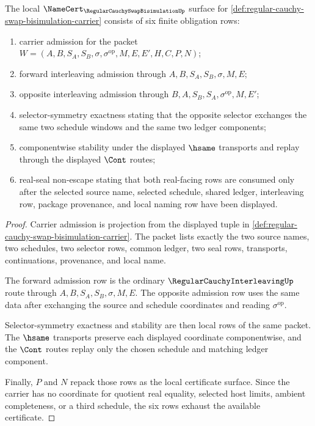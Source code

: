\begin{theorem}
\label{thm:regular-cauchy-swap-bisimulation-namecert-obligations}
The local $\NameCert_{\RegularCauchySwapBisimulationUp}$ surface for \autoref{def:regular-cauchy-swap-bisimulation-carrier} consists of six finite obligation rows:
\begin{enumerate}
\item carrier admission for the packet $W=(A,B,S_A,S_B,\sigma,\sigma^{\mathrm{op}},M,E,E',H,C,P,N)$;
\item forward interleaving admission through $A,B,S_A,S_B,\sigma,M,E$;
\item opposite interleaving admission through $B,A,S_B,S_A,\sigma^{\mathrm{op}},M,E'$;
\item selector-symmetry exactness stating that the opposite selector exchanges the same two schedule windows and the same two ledger components;
\item componentwise stability under the displayed $\hsame$ transports and replay through the displayed $\Cont$ routes;
\item real-seal non-escape stating that both real-facing rows are consumed only after the selected source name, selected schedule, shared ledger, interleaving row, package provenance, and local naming row have been displayed.
\end{enumerate}
\end{theorem}
\begin{proof}
Carrier admission is projection from the displayed tuple in \autoref{def:regular-cauchy-swap-bisimulation-carrier}. The packet lists exactly the two source names, two schedules, two selector rows, common ledger, two seal rows, transports, continuations, provenance, and local name.

The forward admission row is the ordinary $\RegularCauchyInterleavingUp$ route through $A,B,S_A,S_B,\sigma,M,E$. The opposite admission row uses the same data after exchanging the source and schedule coordinates and reading $\sigma^{\mathrm{op}}$.

Selector-symmetry exactness and stability are then local rows of the same packet. The $\hsame$ transports preserve each displayed coordinate componentwise, and the $\Cont$ routes replay only the chosen schedule and matching ledger component.

Finally, $P$ and $N$ repack those rows as the local certificate surface. Since the carrier has no coordinate for quotient real equality, selected host limits, ambient completeness, or a third schedule, the six rows exhaust the available certificate.
\end{proof}

